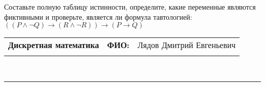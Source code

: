 \documentclass[10pt]{exam}
\newcommand{\class}{Дискретная математика}
\newcommand{\examdate}{}
\begin{document}
\begin{questions}
\begin{enumerate}[a)]
\end{enumerate}\question Составьте полную таблицу истинности, определите, какие переменные являются фиктивными и проверьте, является ли формула тавтологией:
$(( P \land \neg Q) \rightarrow (R \land \neg R)) \rightarrow (P \rightarrow Q)$

\end{questions}
\newpage
\begin{flushright}
\begin{tabular}{p{2.8in} r l}
\textbf{\class} & \textbf{ФИО:} &Лядов Дмитрий Евгеньевич
\\

\textbf{\examdate} &&\\
\end{tabular}\\
\end{flushright}
\rule[1ex]{\textwidth}{.1pt}
\end{document}
